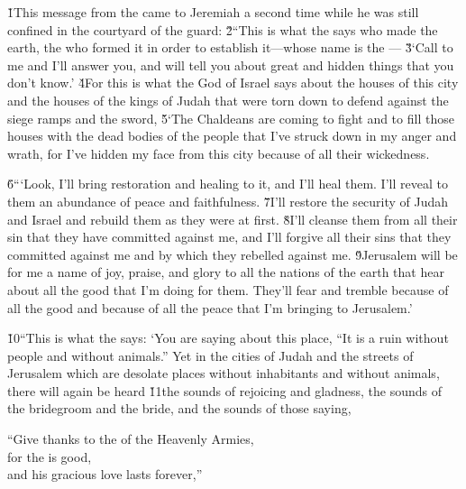 \v{1}This message from the  came to Jeremiah a second time while he was still confined in the courtyard of the guard: \v{2}``This is what the  says who made the earth, the  who formed it in order to establish it---whose name is the --- \v{3}`Call to me and I'll answer you, and will tell you about great and hidden things that you don't know.' \v{4}For this is what the  God of Israel says about the houses of this city and the houses of the kings of Judah that were torn down to defend against the siege ramps and the sword, \v{5}`The Chaldeans are coming to fight and to fill those houses with the dead bodies of the people that I've struck down in my anger and wrath, for I've hidden my face from this city because of all their wickedness.

\v{6}```Look, I'll bring restoration and healing to it, and I'll heal them. I'll reveal to them an abundance of peace and faithfulness. \v{7}I'll restore the security of Judah and Israel and rebuild them as they were at first. \v{8}I'll cleanse them from all their sin that they have committed against me, and I'll forgive all their sins that they committed against me and by which they rebelled against me. \v{9}Jerusalem will be for me a name of joy, praise, and glory to all the nations of the earth that hear about all the good that I'm doing for them. They'll fear and tremble because of all the good and because of all the peace that I'm bringing to Jerusalem.'

\v{10}``This is what the  says: `You are saying about this place, ``It is a ruin without people and without animals.'' Yet in the cities of Judah and the streets of Jerusalem which are desolate places without inhabitants and without animals, there will again be heard \v{11}the sounds of rejoicing and gladness, the sounds of the bridegroom and the bride, and the sounds of those saying,

\begin{poetry}
\poeml ``Give thanks to the  of the Heavenly Armies, \\
\poemll    for the  is good, \\
\poemlll       and his gracious love lasts forever,''
\end{poetry}

